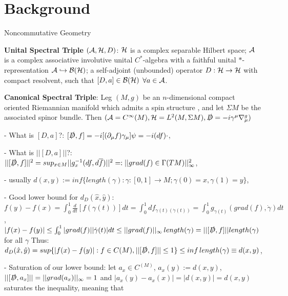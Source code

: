 \section{Background}

\begin{frame}{Noncommutative Geometry} %
    
    \textbf{Unital Spectral Triple} $(\mathcal A , \mathcal H, D)$: $\mathcal H$ is a complex separable Hilbert space; $\mathcal A$ is a complex associative involutive unital $C^*$-algebra with a faithful unital $*$-representation $\mathcal A \hookrightarrow \mathcal B(\mathcal H)$; a self-adjoint (unbounded) operator $D: \mathcal H \to \mathcal H$ with compact resolvent, such that $[D, a] \in \mathcal B(\mathcal H)$ $\forall a \in \mathcal A$.
    
    \textbf{Canonical Spectral Triple}: Leg $(M, g)$ be an $n$-dimensional compact oriented Riemannian manifold which admits a spin structure%
    , and let $\Sigma M$ %
    be the associated spinor bundle. Then $(\mathcal A = C^\infty(M), \mathcal H = L^2(M, \Sigma M), \slashed D = -i \gamma^\mu \nabla^g_\mu)$%
    
    - What is $[D, a]$?: $[\slashed D, f] = -i [(\partial_\mu f) \gamma_\mu] \psi = -i(df)\cdot$,
    
    - What is $||[D, a]||$?: $||[\slashed D, f]||^2 = sup_{x \in M} ||g_x^{-1}(df, d \overline{f})||^2 =: ||grad(f) \in \Gamma(TM)||_\infty^2$,
    
    - usually $d(x, y) := inf\{length(\gamma): \gamma:[0,1] \to M; \gamma(0) = x, \gamma(1) = y\}$,
    
    - Good lower bound for $d_D(\hat x, \hat y)$: $f(y) - f(x) = \int_0^1 \frac{d}{dt}[f(\gamma(t))]dt = \int_0^1 df_{\gamma(t) (\dot \gamma(t))} = \int_0^1 g_{\gamma(t)}(grad(f), \dot \gamma) dt$,
    $|f(x) - f(y)| \leq \int_0^1 |grad(f)| |\dot \gamma(t)| dt \leq ||grad(f)||_
    \infty \, length(\gamma) = ||[\slashed D, f]|| length(\gamma)$ for all $\gamma$
    Thus:
    $d_D(\hat x, \hat y) = sup\{|f(x) - f(y)|: f \in C(M), ||[\slashed D, f]||\leq 1\} \leq inf \, length(\gamma) \equiv d(x, y)$,
    
    - Saturation of our lower bound: let $a_x \in C^(M)$, $a_x(y) := d(x, y)$, %
    $||[\slashed D, a_x]|| = ||grad(a_x)||_\infty = 1$ and $|a_x(y) - a_x(x)| = |d(x,y)| = d(x,y)$ saturates the inequality, meaning that
    \begin{equation}
        

\end{equation}
\end{frame}
